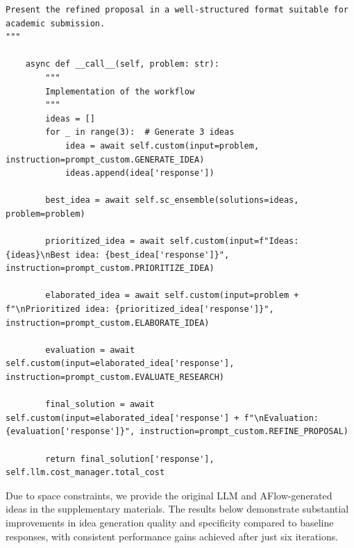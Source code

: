 \documentclass{article} %
\newcommand{\model}{{\sc AFlow}\xspace}
\theoremstyle{plain}
\theoremstyle{definition}
\theoremstyle{remark}
\begin{document}
\begin{tcolorbox}[title={\textbf{\small Idea generation workflow}}, boxrule=2pt, arc=0mm, breakable]
\begin{verbatim}
Present the refined proposal in a well-structured format suitable for academic submission.
"""

    async def __call__(self, problem: str):
        """
        Implementation of the workflow
        """
        ideas = []
        for _ in range(3):  # Generate 3 ideas
            idea = await self.custom(input=problem, instruction=prompt_custom.GENERATE_IDEA)
            ideas.append(idea['response'])
        
        best_idea = await self.sc_ensemble(solutions=ideas, problem=problem)
        
        prioritized_idea = await self.custom(input=f"Ideas: {ideas}\nBest idea: {best_idea['response']}", instruction=prompt_custom.PRIORITIZE_IDEA)
        
        elaborated_idea = await self.custom(input=problem + f"\nPrioritized idea: {prioritized_idea['response']}", instruction=prompt_custom.ELABORATE_IDEA)
        
        evaluation = await self.custom(input=elaborated_idea['response'], instruction=prompt_custom.EVALUATE_RESEARCH)
        
        final_solution = await self.custom(input=elaborated_idea['response'] + f"\nEvaluation: {evaluation['response']}", instruction=prompt_custom.REFINE_PROPOSAL)
        
        return final_solution['response'], self.llm.cost_manager.total_cost

\end{verbatim}
\end{tcolorbox}

Due to space constraints, we provide the original LLM and \model-generated ideas in the supplementary materials. The results below demonstrate substantial improvements in idea generation quality and specificity compared to baseline responses, with consistent performance gains achieved after just six iterations.
\end{document}
